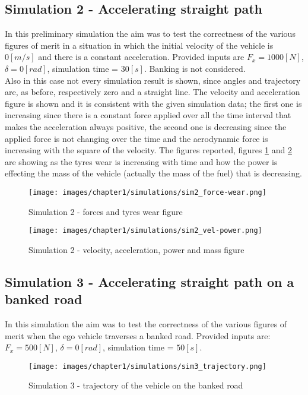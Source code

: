 \documentclass{report}
\let\Oldsubsection\subsection
\renewcommand{\subsection}{\FloatBarrier\Oldsubsection}
\begin{document}
\subsection{Simulation 2 - Accelerating straight path}
In this preliminary simulation the aim was to test the correctness of the various figures of merit in a situation in which the initial velocity of the vehicle is $0[m/s]$ and there is a constant acceleration. Provided inputs are $F_x = 1000 [N]$, $\delta = 0 [rad]$, simulation time = $30 [s]$. Banking is not considered.
\\Also in this case not every simulation result is shown, since angles and trajectory are, as before, respectively zero and a straight line. The velocity and acceleration figure is shown and it is consistent with the given simulation data; the first one is increasing since there is a constant force applied over all the time interval that makes the acceleration always positive, the second one is decreasing since the applied force is not changing over the time and the aerodynamic force is increasing with the square of the velocity. The figures reported, figures \ref{fig:sim2_1} and \ref{fig:sim2_2} are showing as the tyres wear is increasing with time and how the power is effecting the mass of the vehicle (actually the mass of the fuel) that is decreasing.\\ 
\begin{figure}[h!]
    \centering
    \texttt{[image: images/chapter1/simulations/sim2\_force-wear.png]}
    \caption{Simulation 2 - forces and tyres wear figure}
    \label{fig:sim2_1}
\end{figure}
\begin{figure}[h!]
    \centering
    \texttt{[image: images/chapter1/simulations/sim2\_vel-power.png]}
    \caption{Simulation 2 - velocity, acceleration, power and mass figure}
    \label{fig:sim2_2}
\end{figure}

\subsection{Simulation 3 - Accelerating straight path on a banked road}
In this simulation the aim was to test the correctness of the various figures of merit when the ego vehicle traverses a banked road. Provided inputs are: $F_x = 500 [N]$, $\delta = 0 [rad]$, simulation time = $50 [s]$. 

\begin{figure}[h!]
    \centering
    \texttt{[image: images/chapter1/simulations/sim3\_trajectory.png]}
    \caption{Simulation 3 - trajectory of the vehicle on the banked road}
    \label{fig:sim3_1}
\end{figure}
\end{document}
